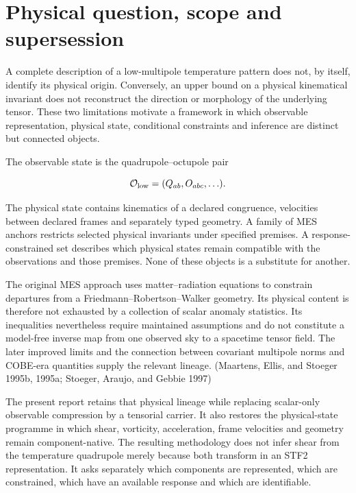 \documentclass[
  11pt,
  a4paper]{article}
\begin{document}
\hypertarget{physical-question-scope-and-supersession}{%
\section{Physical question, scope and supersession}\label{physical-question-scope-and-supersession}}

A complete description of a low-multipole temperature pattern does not, by itself, identify its physical origin. Conversely, an upper bound on a physical kinematical invariant does not reconstruct the direction or morphology of the underlying tensor. These two limitations motivate a framework in which observable representation, physical state, conditional constraints and inference are distinct but connected objects.

The observable state is the quadrupole--octupole pair

\[
\mathcal O_{\rm low}=(Q_{ab},O_{abc},\ldots).
\]

The physical state contains kinematics of a declared congruence, velocities between declared frames and separately typed geometry. A family of MES anchors restricts selected physical invariants under specified premises. A response-constrained set describes which physical states remain compatible with the observations and those premises. None of these objects is a substitute for another.

The original MES approach uses matter--radiation equations to constrain departures from a Friedmann--Robertson--Walker geometry. Its physical content is therefore not exhausted by a collection of scalar anomaly statistics. Its inequalities nevertheless require maintained assumptions and do not constitute a model-free inverse map from one observed sky to a spacetime tensor field. The later improved limits and the connection between covariant multipole norms and COBE-era quantities supply the relevant lineage. (Maartens, Ellis, and Stoeger 1995b, 1995a; Stoeger, Araujo, and Gebbie 1997)

The present report retains that physical lineage while replacing scalar-only observable compression by a tensorial carrier. It also restores the physical-state programme in which shear, vorticity, acceleration, frame velocities and geometry remain component-native. The resulting methodology does not infer shear from the temperature quadrupole merely because both transform in an STF2 representation. It asks separately which components are represented, which are constrained, which have an available response and which are identifiable.
\end{document}
